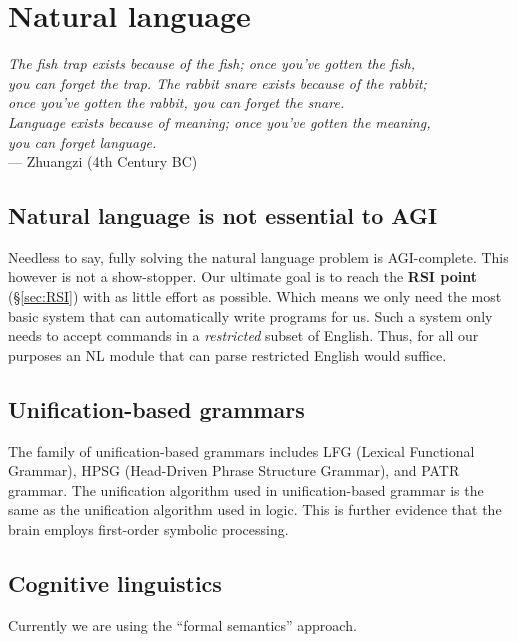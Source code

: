 \chapter{Natural language}
\begin{flushright}
\emph{The fish trap exists because of the fish; once you've gotten the fish,\\
you can forget the trap. The rabbit snare exists because of the rabbit;\\
once you've gotten the rabbit, you can forget the snare.\\
Language exists because of meaning; once you've gotten the meaning,\\
you can forget language.}\\ --- Zhuangzi (4th Century BC)
\end{flushright}
\minitoc

\section{Natural language is not essential to AGI}

Needless to say, fully solving the natural language problem is AGI-complete.  This however is not a show-stopper.  Our ultimate goal is to reach the \textbf{RSI point} (\S\ref{sec:RSI}) with as little effort as possible.  Which means we only need the most basic system that can automatically write programs for us.  Such a system only needs to accept commands in a \textit{restricted} subset of English.  Thus, for all our purposes an NL module that can parse restricted English would suffice.

\section{Unification-based grammars}

The family of unification-based grammars includes LFG (Lexical Functional Grammar), HPSG (Head-Driven Phrase Structure Grammar), and PATR grammar.  The unification algorithm used in unification-based grammar is the same as the unification algorithm used in logic.  This is further evidence that the brain employs first-order symbolic processing.

\section{Cognitive linguistics}

Currently we are using the ``formal semantics'' approach.


